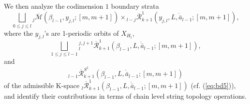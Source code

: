 \documentclass[a4paper]{article}
\numberwithin{equation}{section}
\begin{document}
We then analyze the codimension $1$ boundary strata
\begin{equation}\label{eq:st1}
\bigsqcup_{0\leq j\leq l}{}_j\overline{\mathcal{M}}(\beta_{l-1},y_{j,l};[m,m+1])\times{}_{l-j}\overline{\mathcal{R}}_{k+1}^1(y_{j,l},L,\ring{\bar{a}}_{l-1};[m,m+1]),
\end{equation}
where the $y_{j,l}$'s are 1-periodic orbits of $X_{H_t}$,
\begin{equation}\label{eq:st2}
\bigsqcup_{1\leq j\leq l-1}{}_l^{j,j+1}\overline{\mathcal{R}}_{k+1}^1(\beta_{l-1},L,\ring{\bar{a}}_{l-1};[m,m+1]),
\end{equation}
and
\begin{equation}\label{eq:st3}
{}_{l-1}\overline{\mathcal{R}}_{k+1}^{S^1}(\beta_{l-1},L,\ring{\bar{a}}_{l-1};[m,m+1])
\end{equation}
of the admissible K-space ${}_l\overline{\mathcal{R}}_{k+1}^1(\beta_{l-1},L,\ring{\bar{a}}_{l-1};[m,m+1])$ (cf. (\ref{eq:bd5})), and identify their contributions in terms of chain level string topology operations.
\end{document}
